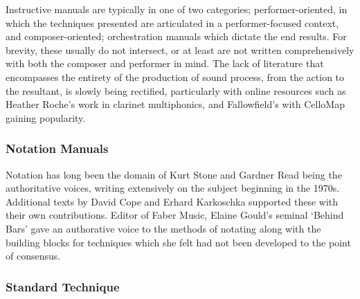 Instructive manuals are typically in one of two categories; performer-oriented, in which the techniques presented are articulated in a performer-focused context, and composer-oriented; orchestration manuals which dictate the end results.
For brevity, these usually do not intersect, or at least are not written comprehensively with both the composer and performer in mind. 
The lack of literature that encompasses the entirety of the production of sound process, from the action to the resultant, is slowly being rectified, particularly with online resources such as Heather Roche's work in clarinet multiphonics, and Fallowfield's with CelloMap gaining popularity.\autocite{rocheHeatherRoche, fallowfieldCelloMap}
\subsubsection{Notation Manuals}
Notation has long been the domain of Kurt Stone and Gardner Read being the authoritative voices, writing extensively on the subject beginning in the 1970s.\autocite{stoneMusicNotationTwentieth1980,readCompendiumModernInstrumental1993,readContemporaryInstrumentalTechniques1976,readMusicNotationManual1979a}
Additional texts by David Cope and Erhard Karkoschka supported these with their own contributions.\autocite{copeNewMusicNotation1976,karkoschkaNotationNewMusic1972}
Editor of Faber Music, Elaine Gould's seminal `Behind Bars' gave an authorative voice to the methods of notating along with the building blocks for techniques which she felt had not been developed to the point of consensus.\autocite[iii]{gouldBars2011}

\subsubsection{Standard Technique}



